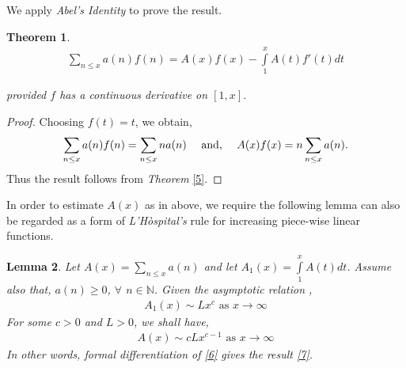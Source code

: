 \documentclass[article,12pt]{elsarticle}
\newtheorem{thm}{Theorem}[section]
\newtheorem{lemma}[thm]{Lemma}
\begin{document}
	We apply \textit{Abel's Identity} to prove the result.
	\begin{thm}
		\begin{eqnarray}\label{5}
			\sum\limits_{n\leq x}a(n)f(n)=A(x)f(x)-\int\limits_{1}^{x}A(t)f'(t)dt 
		\end{eqnarray}
		
		provided $f$ has a continuous derivative on $[1,x]$.
	\end{thm}
	\begin{proof}
		Choosing $f(t)=t$, we obtain,
		\begin{align*}
			\sum\limits_{n\leq x}a(n)f(n)=\sum\limits_{n\leq x}na(n)\mbox{ \hspace{10pt}and, \hspace{10pt}}A(x)f(x)=n\sum\limits_{n\leq x}a(n).
		\end{align*}
		Thus the result follows from \textit{Theorem} \eqref{5}.
	\end{proof}
	In order to estimate $A(x)$ as in above, we require the following lemma can also be regarded as a form of \textit{L'H\`{o}spital's} rule for increasing piece-wise linear functions.
	\begin{lemma}\label{lemma2}
		Let $A(x)=\sum\limits_{n\leq x}a(n)$ and let $A_{1}(x)=\int\limits_{1}^{x}A(t)dt$. Assume also that, $a(n)\geq 0$,       $\forall$  $ n\in \mathbb{N}$. Given the asymptotic relation ,
		\begin{eqnarray}\label{6}
			A_{1}(x)\sim Lx^{c}    \mbox{    as     } x\rightarrow \infty
		\end{eqnarray}
		For some $c>0$ and $L>0$, we shall have,
		\begin{eqnarray}\label{7}
			A(x)\sim cLx^{c-1}       \mbox{    as   } x\rightarrow \infty
		\end{eqnarray}
		In other words, formal differentiation of \eqref{6} gives	the result \eqref{7}.
	\end{lemma}
\end{document}
